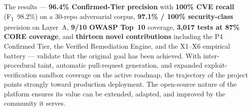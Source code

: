 The results --- \textbf{96.4\% Confirmed-Tier precision} with \textbf{100\% CVE recall} (F\textsubscript{1}~98.2\%) on a 30-repo adversarial corpus, \textbf{97.1\% / 100\% security-class} precision on Layer~A, \textbf{9/10 OWASP Top~10} coverage, \textbf{3,017 tests at 87\% CORE coverage}, and \textbf{thirteen novel contributions} including the P4 Confirmed Tier, the Verified Remediation Engine, and the X1--X6 empirical battery --- validate that the original goal has been achieved. With inter-procedural taint, automatic pull-request generation, and expanded exploit-verification sandbox coverage on the active roadmap, the trajectory of the project points strongly toward production deployment. The open-source nature of the platform ensures its value can be extended, adapted, and improved by the community it serves.

\clearpage
